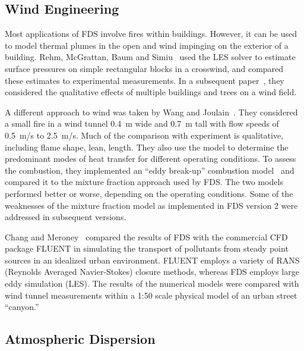 \subsection{Wind Engineering}

Most applications  of FDS involve fires within  buildings. However, it can be used to model thermal  plumes in the open and wind impinging on the
exterior   of   a   building.    Rehm,   McGrattan,   Baum   and Simiu~\cite{LES:4} used the LES solver to estimate surface pressures on simple
rectangular blocks in  a crosswind, and compared these estimates to experimental measurements.  In a subsequent paper~\cite{Rehm:WS02}, they considered
the qualitative  effects of multiple buildings and trees on a wind field.

A   different    approach   to   wind    was   taken   by    Wang   and Joulain~\cite{Wang:IAFSS2002}. They  considered a  small fire in  a wind tunnel
0.4~m wide  and  0.7~m tall  with  flow speeds  of 0.5~m/s  to 2.5~m/s.  Much  of  the  comparison with  experiment  is  qualitative, including
flame shape,  lean,  length.  They also  use  the model  to determine  the  predominant  modes  of  heat  transfer  for  different operating
conditions. To  assess  the combustion,  they implemented  an ``eddy break-up''  combustion model~\cite{Magnussen:1} and  compared it to the mixture
fraction approach used by FDS.  The two models performed better or  worse, depending on  the operating conditions. Some  of the weaknesses of the
mixture fraction model as implemented in FDS version 2 were addressed in subsequent versions.

Chang and Meroney~\cite{ChangJWE2003} compared the results of FDS with the  commercial CFD  package  FLUENT in  simulating  the transport  of
pollutants   from  steady   point  sources   in  an   idealized  urban environment.  FLUENT  employs a  variety  of  RANS (Reynolds  Averaged
Navier-Stokes)  closure  methods,   whereas  FDS  employs  large  eddy simulation (LES).   The results of the numerical  models were compared with
wind tunnel measurements within a 1:50 scale physical model of an urban street ``canyon.''


\subsection{Atmospheric Dispersion}

